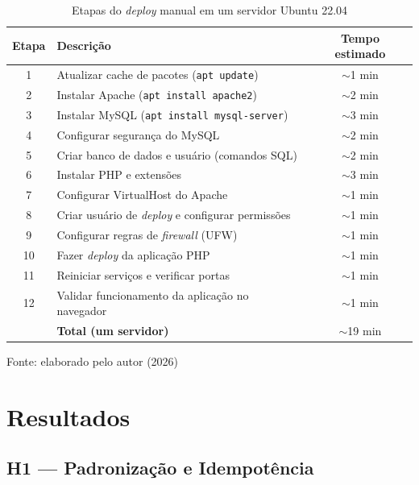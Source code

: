 \documentclass[12pt]{article}
\newcommand{\fonte}[1]{%
  \begin{flushleft}
    \footnotesize Fonte: #1
  \end{flushleft}%
}
\begin{document}
\begin{table}[H]
  \centering
  \caption{Etapas do \textit{deploy} manual em um servidor Ubuntu 22.04}
  \label{tab:manual_steps}
  \begin{tabular}{clc}
    \toprule
    \textbf{Etapa} & \textbf{Descrição} & \textbf{Tempo estimado} \\
    \midrule
    1 & Atualizar cache de pacotes (\texttt{apt update})         & $\sim$1 min \\
    2 & Instalar Apache (\texttt{apt install apache2})           & $\sim$2 min \\
    3 & Instalar MySQL (\texttt{apt install mysql-server})       & $\sim$3 min \\
    4 & Configurar segurança do MySQL                           & $\sim$2 min \\
    5 & Criar banco de dados e usuário (comandos SQL)            & $\sim$2 min \\
    6 & Instalar PHP e extensões                                 & $\sim$3 min \\
    7 & Configurar VirtualHost do Apache                         & $\sim$1 min \\
    8 & Criar usuário de \textit{deploy} e configurar permissões & $\sim$1 min \\
    9 & Configurar regras de \textit{firewall} (UFW)             & $\sim$1 min \\
    10 & Fazer \textit{deploy} da aplicação PHP                  & $\sim$1 min \\
    11 & Reiniciar serviços e verificar portas                   & $\sim$1 min \\
    12 & Validar funcionamento da aplicação no navegador         & $\sim$1 min \\
    \midrule
    & \textbf{Total (um servidor)}                              & $\sim$19 min \\
    \bottomrule
  \end{tabular}
  \fonte{elaborado pelo autor (2026)}
\end{table}

\section{Resultados}


\subsection{H1 --- Padronização e Idempotência}
\end{document}

